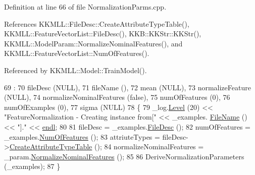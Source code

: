 Definition at line 66 of file Normalization\+Parms.\+cpp.



References K\+K\+M\+L\+L\+::\+File\+Desc\+::\+Create\+Attribute\+Type\+Table(), K\+K\+M\+L\+L\+::\+Feature\+Vector\+List\+::\+File\+Desc(), K\+K\+B\+::\+K\+K\+Str\+::\+K\+K\+Str(), K\+K\+M\+L\+L\+::\+Model\+Param\+::\+Normalize\+Nominal\+Features(), and K\+K\+M\+L\+L\+::\+Feature\+Vector\+List\+::\+Num\+Of\+Features().



Referenced by K\+K\+M\+L\+L\+::\+Model\+::\+Train\+Model().


\begin{DoxyCode}
69                                         :
70   fileDesc                 (NULL),
71   fileName                 (),
72   mean                     (NULL),
73   normalizeFeature         (NULL),
74   normalizeNominalFeatures (\textcolor{keyword}{false}),
75   numOfFeatures            (0),
76   numOfExamples            (0),
77   sigma                    (NULL)
78 \{
79   \_log.\hyperlink{class_k_k_b_1_1_run_log_a32cf761d7f2e747465fd80533fdbb659}{Level} (20) << \textcolor{stringliteral}{"FeatureNormalization - Creating instance from["} << \_examples.
      \hyperlink{class_k_k_m_l_l_1_1_feature_vector_list_a48c9a43f0aa93a2251a5b8d4e38c4deb}{FileName} () << \textcolor{stringliteral}{"]."} << \hyperlink{namespace_k_k_b_ad1f50f65af6adc8fa9e6f62d007818a8}{endl};
80 
81   fileDesc                 = \_examples.\hyperlink{class_k_k_m_l_l_1_1_feature_vector_list_a736923be9c4ac7553a5aa87dd24efd16}{FileDesc} ();
82   numOfFeatures = \_examples.\hyperlink{class_k_k_m_l_l_1_1_feature_vector_list_a9b14c44e69c63c7680547f0675ab3e7a}{NumOfFeatures} ();
83   attriuteTypes            = fileDesc->\hyperlink{class_k_k_m_l_l_1_1_file_desc_a924736ac68c054c64001fe836ba7c1e3}{CreateAttributeTypeTable} ();
84   normalizeNominalFeatures = \_param.\hyperlink{class_k_k_m_l_l_1_1_model_param_ae84da9624f59dd8b1599cc5a1d3fe84d}{NormalizeNominalFeatures} ();
85 
86   DeriveNormalizationParameters (\_examples);
87 \}
\end{DoxyCode}

